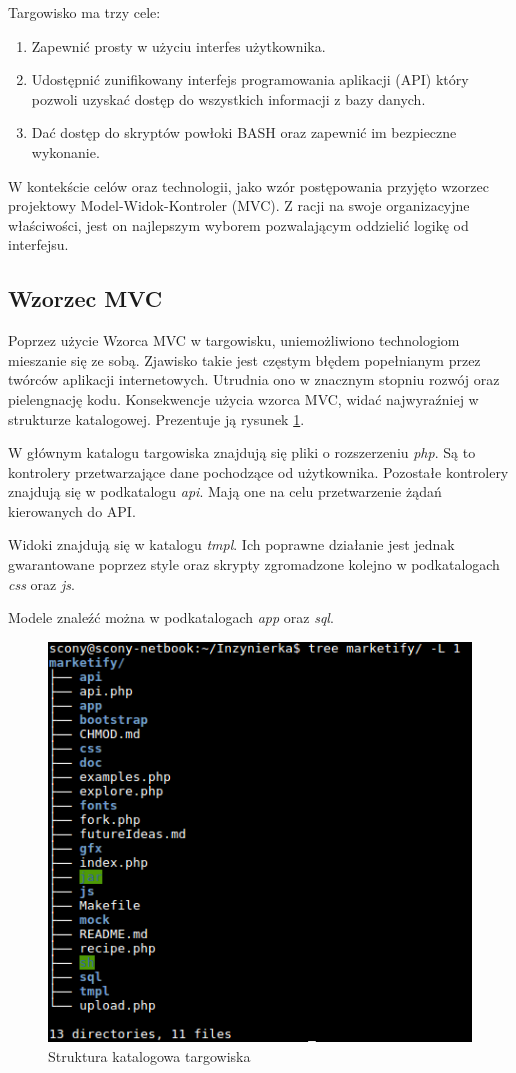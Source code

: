 \documentclass[11pt,a4paper,polish,thesis]{dcsbook}
\begin{document}
Targowisko ma trzy cele:
\begin{enumerate}
\item Zapewnić prosty w użyciu interfes użytkownika.
\item Udostępnić zunifikowany interfejs programowania aplikacji (API) który pozwoli uzyskać dostęp do wszystkich informacji z bazy danych.
\item Dać dostęp do skryptów powłoki BASH oraz zapewnić im bezpieczne wykonanie.
\end{enumerate}

W kontekście celów oraz technologii, jako wzór postępowania przyjęto wzorzec projektowy Model-Widok-Kontroler (MVC). Z racji na swoje organizacyjne właściwości, jest
on najlepszym wyborem pozwalającym oddzielić logikę od interfejsu.
\subsection{Wzorzec MVC}
Poprzez użycie Wzorca MVC w targowisku, uniemożliwiono technologiom mieszanie się ze sobą. Zjawisko takie jest częstym błędem popełnianym przez twórców aplikacji
internetowych. Utrudnia ono w znacznym stopniu rozwój oraz pielengnację kodu. Konsekwencje użycia wzorca MVC, widać najwyraźniej w strukturze katalogowej.
Prezentuje ją rysunek \ref{fig:market_tree}.

W głównym katalogu targowiska znajdują się pliki o rozszerzeniu \emph{php}. Są to kontrolery przetwarzające dane pochodzące od użytkownika. Pozostałe kontrolery
znajdują się w podkatalogu \emph{api}. Mają one na celu przetwarzenie żądań kierowanych do API.

Widoki znajdują się w katalogu \emph{tmpl}. Ich poprawne działanie jest jednak gwarantowane poprzez style oraz skrypty zgromadzone kolejno w podkatalogach
\emph{css} oraz \emph{js}.

Modele znaleźć można w podkatalogach \emph{app} oraz \emph{sql}.
\begin{figure}[p]
  \centering
  \includegraphics[scale=0.7]{./resources/market_tree.png}
  \caption{Struktura katalogowa targowiska}
  \label{fig:market_tree}
\end{figure}
\end{document}
